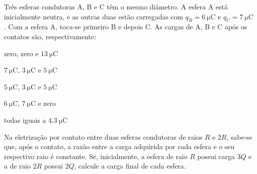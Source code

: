 \begin{questao}[3]{}
Três esferas condutoras A, B e C têm o mesmo diâmetro. A esfera A está
inicialmente neutra, e as outras duas estão carregadas com
$q_B = \SI{6}{\micro\coulomb}$ e $q_C = \SI{7}{\micro\coulomb}$. Com a esfera A,
toca-se primeiro B e depois C. As cargas de A, B e C após os contatos são,
respectivamente:
\begin{alternativas}
\item zero, zero e $\SI{13}{\micro\coulomb}$
\item $\SI{7}{\micro\coulomb}$, $\SI{3}{\micro\coulomb}$ e $\SI{5}{\micro\coulomb}$
\item $\SI{5}{\micro\coulomb}$, $\SI{3}{\micro\coulomb}$ e $\SI{5}{\micro\coulomb}$
\item $\SI{6}{\micro\coulomb}$, $\SI{7}{\micro\coulomb}$ e zero
\item todas iguais a $\SI{4.3}{\micro\coulomb}$
\end{alternativas}
\end{questao}

\begin{questao}[3]{}
Na eletrização por contato entre duas esferas condutoras de raios $R$ e $2R$,
sabe-se que, após o contato, a razão entre a carga adquirida por cada esfera e o
seu respectivo raio é constante. Se, inicialmente, a esfera de raio $R$ possui
carga $3Q$ e a de raio $2R$ possui $2Q$, calcule a carga final de cada esfera.
\end{questao}

